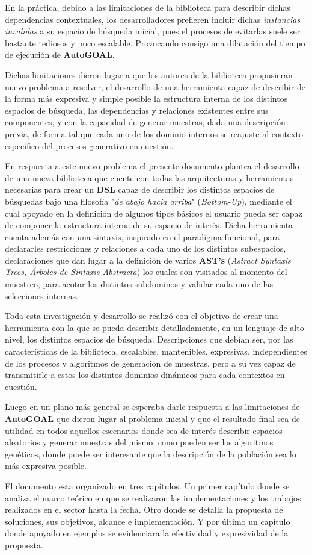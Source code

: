 En la práctica, debido a las limitaciones de la biblioteca para describir dichas
dependencias contextuales, los desarrolladores prefieren incluir dichas {\it instancias
        invalidas} a su espacio de búsqueda inicial, pues el procesos de evitarlas suele
ser bastante tediosos y poco escalable. Provocando consigo una dilatación del
tiempo de ejecución de {\bf AutoGOAL}.

Dichas limitaciones dieron lugar a que los autores de la biblioteca propusieran
nuevo problema a resolver, el desarrollo de una herramienta capaz de describir de
la forma más expresiva y simple posible la estructura interna de los
distintos espacios de búsqueda, las dependencias y relaciones existentes entre sus
componentes, y con la capacidad de generar muestras, dada una descripción
previa, de forma tal que cada uno de los dominio internos se reajuste al contexto
específico del procesos generativo en cuestión.

En respuesta a este nuevo problema el presente documento plantea el desarrollo de una
nueva biblioteca que cuente con todas las arquitecturas y herramientas necesarias para
crear un {\bf DSL} capaz de describir los distintos espacios de búsquedas bajo una
filosofía "{\it de abajo hacia arriba}" ({\it Bottom-Up}), mediante el cual apoyado
en la definición de algunos tipos básicos el usuario pueda ser capaz de componer la
estructura interna de su espacio de interés. Dicha herramienta cuenta además con una
sintaxis, inspirado en el paradigma funcional, para declararles restricciones y
relaciones a cada uno de los distintos subespacios, declaraciones que dan lugar a la
definición de varios {\bf AST's} ({\it Astract Syntaxis Trees, Árboles de Sintaxis
        Abstracta}) los cuales son visitados al momento del muestreo, para acotar los distintos
subdominos y validar cada uno de las selecciones internas.

Toda esta investigación y desarrollo se realizó con el objetivo de crear una
herramienta con la que se pueda describir detalladamente, en un lenguaje de alto nivel,
los distintos espacios de búsqueda. Descripciones que debían ser,
por las características de la biblioteca, escalables, mantenibles, expresivas,
independientes de los procesos y algoritmos de generación de muestras, pero a
su vez capaz de transmitirle a estos los distintos dominios dinámicos para
cada contextos en cuestión.

Luego en un plano más general se esperaba darle respuesta a las limitaciones
de {\bf AutoGOAL} que dieron lugar al problema inicial y que el resultado final sea
de utilidad en todos aquellos escenarios donde sea de interés describir espacios
aleatorios y generar muestras del mismo, como pueden ser los algoritmos genéticos,
donde puede ser interesante que la descripción de la población sea lo más expresiva
posible.

El documento esta organizado en tres capítulos. Un primer capítulo donde se analiza
el marco teórico en que se realizaron las implementaciones y los trabajos realizados
en el sector hasta la fecha. Otro donde se detalla la propuesta de soluciones, sus
objetivos, alcance e implementación. Y por último un capítulo donde apoyado en ejemplos
se evidenciara la efectividad y expresividad de la propuesta.
